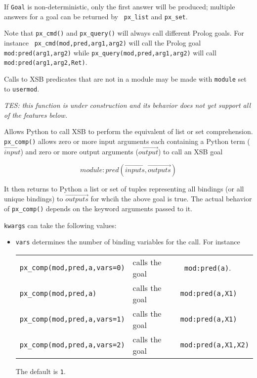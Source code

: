 \begin{description}
     If {\tt Goal} is non-deterministic, only the first answer will be
     produced; multiple answers for a goal can be returned by {\tt
       px\_list} and {\tt px\_set}.

     Note that {\tt px\_cmd()} and {\tt px\_query()} will always call
     different Prolog goals.  For instance {\tt
       px\_cmd(mod,pred,arg1,arg2)} will call the Prolog goal {\tt
       mod:pred(arg1,arg2)} while {\tt px\_query(mod,pred,arg1,arg2)}
     will call {\tt mod:pred(arg1,arg2,Ret)}.
     
     Calls to XSB predicates that are not in a module may be made with
     {\tt module} set to {\tt usermod}.

%
{\em TES: this function is under construction and its behavior does
  not yet support all of the features below.}
  
  Allows Python to call XSB to perform the equivalent of list or set
  comprehension.  {\tt px\_comp()} allows zero or more input arguments
  each containing a Python term ($\overrightarrow{input}$) and zero or
  more output arguments ($\overrightarrow{output}$) to call an XSB goal

\[module:pred(\overrightarrow{inputs},\overrightarrow{outputs}) \]

It then returns to Python a list or set of tuples representing all
bindings (or all unique bindings) to $\overrightarrow{outputs}$ for
whcih the above goal is true.  The actual behavior of {\tt px\_comp()}
depends on the keyword arguments passed to it.

{\tt kwargs} can take the following values:
\begin{itemize}
  \item {\tt vars} determines the number of binding variables for the
    call.  For instance
\begin{tabular}{lll}
    {\tt px\_comp(mod,pred,a,vars=0)} & calls the goal & {\tt
      mod:pred(a)}. \\
    {\tt px\_comp(mod,pred,a)} & calls the goal & {\tt mod:pred(a,X1)} \\
    {\tt px\_comp(mod,pred,a,vars=1)} & calls the goal & {\tt mod:pred(a,X1)} \\
    {\tt px\_comp(mod,pred,a,vars=2)} & calls the goal & {\tt mod:pred(a,X1,X2)} \\
\end{tabular}    
    
    \noindent
    The default is {\tt 1}.
    

\end{itemize}
\end{description}
